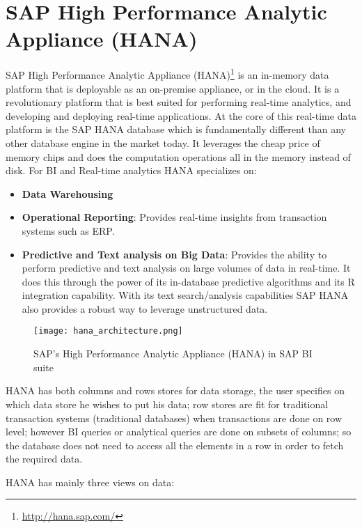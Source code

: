\section{SAP High Performance Analytic Appliance (HANA)}

SAP High Performance Analytic Appliance (HANA)\footnote{\url{http://hana.sap.com/}} is an in-memory data platform that is deployable as an on-premise appliance, or in the cloud. It is a revolutionary platform that is best suited for performing real-time analytics, and developing and deploying real-time applications. At the core of this real-time data platform is the SAP HANA database which is fundamentally different than any other database engine in the market today. It leverages the cheap price of memory chips and does the computation operations all in the memory instead of disk. For BI and Real-time analytics HANA specializes on:

\begin{itemize}
	\item \textbf{Data Warehousing}
	\item \textbf{Operational Reporting}: Provides real-time insights from transaction systems such as ERP.
	\item \textbf{Predictive and Text analysis on Big Data}: Provides the ability to perform predictive and text analysis on large volumes of data in real-time. It does this through the power of its in-database predictive algorithms and its R integration capability. With its text search/analysis capabilities SAP HANA also provides a robust way to leverage unstructured data.
\end{itemize}

\begin{figure}[ht]
\centering
	\texttt{[image: hana\_architecture.png]}
	\caption{SAP's High Performance Analytic Appliance (HANA) in SAP BI suite}
	\label{fig:hana_architecture}
\end{figure}

HANA has both columns and rows stores for data storage, the user specifies on which data store he wishes to put his data; row stores are fit for traditional transaction systems (traditional databases) when transactions are done on row level; however BI queries or analytical queries are done on subsets of columns; so the database does not need to access all the elements in a row in order to fetch the required data.

HANA has mainly three views on data:

